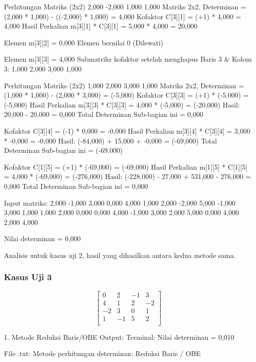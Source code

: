 \documentclass[12pt]{article}
\begin{document}
\begin{enumerate}
\begin{keluaran}
Perhitungan Matriks (2x2)
2,000 -2,000 
1,000 1,000 
Matriks 2x2, Determinan = (2,000 * 1,000) - ((-2,000) * 1,000) = 4,000
Kofaktor C[3][1] = (+1) * 4,000 = 4,000
Hasil Perkalian m[3][1] * C[3][1] = 5,000 * 4,000 = 20,000

Elemen m[3][2] = 0,000
Elemen bernilai 0 (Dilewati)


Elemen m[3][3] = 4,000
Submatriks kofaktor setelah menghapus Baris 3 & Kolom 3:
1,000 2,000 
3,000 1,000 

Perhitungan Matriks (2x2)
1,000 2,000 
3,000 1,000 
Matriks 2x2, Determinan = (1,000 * 1,000) - (2,000 * 3,000) = (-5,000)
Kofaktor C[3][3] = (+1) * (-5,000) = (-5,000)
Hasil Perkalian m[3][3] * C[3][3] = 4,000 * (-5,000) = (-20,000)
Hasil: 20,000 - 20,000 = 0,000
Total Determinan Sub-bagian ini = 0,000

Kofaktor C[3][4] = (-1) * 0,000 = -0,000
Hasil Perkalian m[3][4] * C[3][4] = 3,000 * -0,000 = -0,000
Hasil: (-84,000) + 15,000 + -0,000 = (-69,000)
Total Determinan Sub-bagian ini = (-69,000)

Kofaktor C[1][5] = (+1) * (-69,000) = (-69,000)
Hasil Perkalian m[1][5] * C[1][5] = 4,000 * (-69,000) = (-276,000)
Hasil: (-228,000) - 27,000 + 531,000 - 276,000 = 0,000
Total Determinan Sub-bagian ini = 0,000


Input matriks:
2,000	-1,000	3,000	0,000	4,000
1,000	2,000	-2,000	5,000	-1,000
3,000	1,000	1,000	2,000	0,000
0,000	4,000	-1,000	3,000	2,000
5,000	0,000	4,000	2,000	4,000

Nilai determinan = 0,000
\end{keluaran}
Analisis untuk kasus uji 2, hasil yang dihasilkan antara kedua metode sama.
\subsubsection{Kasus Uji 3}
\begin{equation}
    \begin{bmatrix}
        0 & 2 & -1 & 3 \\
        4 & 1 & 2 & -2 \\
        -2 & 3 & 0 & 1 \\
        1 & -1 & 5 & 2 \\
    \end{bmatrix}
\end{equation}
\begin{keluaran}
1. Metode Reduksi Baris/OBE
Output: 
Terminal:
Nilai determinan = 0,010

File .txt:
Metode perhitungan determinan: Reduksi Baris / OBE


\end{keluaran}
\end{enumerate}
\end{document}
